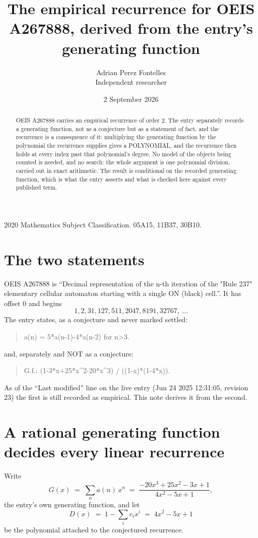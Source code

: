 \documentclass[11pt,a4paper]{article}
\title{The empirical recurrence for OEIS A267888, derived from the entry's generating function}
\author{Adrian Perez Fontelles\\ \small Independent researcher}
\date{2 September 2026}
\theoremstyle{plain}
\theoremstyle{definition}
\begin{document}
\maketitle

\begin{abstract}
OEIS A267888 carries an empirical recurrence of order $2$. The entry separately records a
generating function, not as a conjecture but as a statement of fact, and the recurrence is a
consequence of it: multiplying the generating function by the polynomial the recurrence
supplies gives a POLYNOMIAL, and the recurrence then holds at every index past that
polynomial's degree. No model of the objects being counted is needed, and no search: the
whole argument is one polynomial division, carried out in exact arithmetic. The result is
conditional on the recorded generating function, which is what the entry asserts and what is
checked here against every published term.
\end{abstract}

\noindent\small 2020 Mathematics Subject Classification. 05A15, 11B37, 30B10.\normalsize

\section{The two statements}

OEIS A267888 is ``Decimal representation of the n-th iteration of the "Rule 237" elementary cellular automaton starting with a single ON (black) cell.''. It has offset $0$ and begins
\[
1, 2, 31, 127, 511, 2047, 8191, 32767,\ \dots
\]
The entry states, as a conjecture and never marked settled:
\begin{quote}
a(n) = 5*a(n-1)-4*a(n-2) for n>3.
\end{quote}
and, separately and NOT as a conjecture:
\begin{quote}
G.f.: (1-3*x+25*x\^{}2-20*x\^{}3) / ((1-x)*(1-4*x)).
\end{quote}
As of the ``Last modified'' line on the live entry (Jun 24 2025 12:31:05, revision 23) the first is still
recorded as empirical. This note derives it from the second.

\section{A rational generating function decides every linear recurrence}

Write
\[
G(x)\;=\;\sum_{n}a(n)\,x^{n}\;=\;\frac{- 20 x^{3} + 25 x^{2} - 3 x + 1}{4 x^{2} - 5 x + 1},
\]
the entry's own generating function, and let
\[
D(x)\;=\;1-\sum_i c_i x^{i}\;=\;4 x^{2} - 5 x + 1
\]
be the polynomial attached to the conjectured recurrence.
\end{document}
